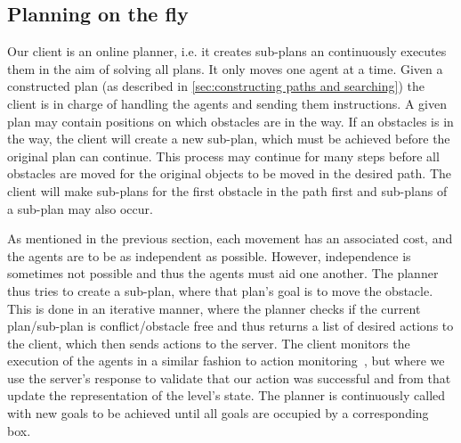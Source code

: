 \subsection{Planning on the fly}
\label{sec:planning on the fly}

Our client is an online planner, i.e. it creates sub-plans an continuously executes them in the aim of solving all plans.
It only moves one agent at a time.
Given a constructed plan (as described in \cref{sec:constructing paths and searching}) the client is in charge of handling the agents and sending them instructions.
A given plan may contain positions on which obstacles are in the way.
If an obstacles is in the way, the client will create a new sub-plan, which must be achieved before the original plan can continue.
This process may continue for many steps before all obstacles are moved for the original objects to be moved in the desired path.
The client will make sub-plans for the first obstacle in the path first and sub-plans of a sub-plan may also occur.

As mentioned in the previous section, each movement has an associated cost, and the agents are to be as independent as possible.
However, independence is sometimes not possible and thus the agents must aid one another.
The planner thus tries to create a sub-plan, where that plan's goal is to move the obstacle.
This is done in an iterative manner, where the planner checks if the current plan/sub-plan is conflict/obstacle free and thus returns a list of desired actions to the client, which then sends actions to the server.
The client monitors the execution of the agents in a similar fashion to action monitoring~\cite{russell2009modern}, but where we use the server's response to validate that our action was successful and from that update the representation of the level's state.
The planner is continuously called with new goals to be achieved until all goals are occupied by a corresponding box.
